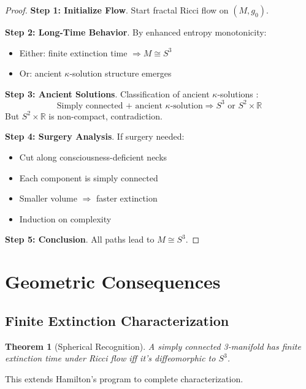 \documentclass[12pt]{article}
\newcommand{\R}{\mathbb{R}}
\newtheorem{theorem}{Theorem}
\begin{document}
\begin{proof}
\textbf{Step 1: Initialize Flow}. Start fractal Ricci flow on $(M,g_0)$.

\textbf{Step 2: Long-Time Behavior}. By enhanced entropy monotonicity:
\begin{itemize}
\item Either: finite extinction time $\Rightarrow M \cong S^3$ \cite{hamilton1982}
\item Or: ancient $\kappa$-solution structure emerges \cite{perelman2002}
\end{itemize}

\textbf{Step 3: Ancient Solutions}. Classification of ancient $\kappa$-solutions \cite{brendle2010}:
\begin{equation}
\text{Simply connected + ancient } \kappa\text{-solution} \Rightarrow S^3 \text{ or } S^2 \times \R
\end{equation}
But $S^2 \times \R$ is non-compact, contradiction.

\textbf{Step 4: Surgery Analysis}. If surgery needed:
\begin{itemize}
\item Cut along consciousness-deficient necks
\item Each component is simply connected
\item Smaller volume $\Rightarrow$ faster extinction
\item Induction on complexity \cite{colding2003}
\end{itemize}

\textbf{Step 5: Conclusion}. All paths lead to $M \cong S^3$.
\end{proof}

\section{Geometric Consequences}

\subsection{Finite Extinction Characterization}

\begin{theorem}[Spherical Recognition]
A simply connected 3-manifold has finite extinction time under Ricci flow iff it's diffeomorphic to $S^3$.
\end{theorem}

This extends Hamilton's program \cite{hamilton1982,hamilton1986} to complete characterization.
\end{document}
